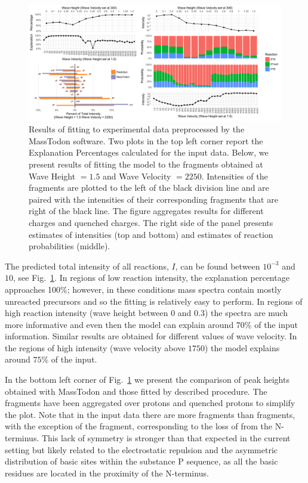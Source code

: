 \documentclass{llncs}
\begin{document}
\begin{figure}[h]
        \center
        \includegraphics[width=1.1\textwidth]{melon.png}
        \caption{ Results of fitting to experimental data preprocessed by the {\sc MassTodon} software. Two plots in the top left corner report the Explanation Percentages calculated for the input data. Below, we present results of fitting the model to the fragments obtained at Wave Height $= 1.5$ and Wave Velocity $= 2250$. Intensities of the  fragments are plotted to the left of the black division line and are paired with the intensities of their corresponding  fragments that are right of the black line. The figure aggregates results for different charges and quenched charges. The right side of the panel presents estimates of intensities (top and bottom) and estimates of reaction probabilities (middle).
        }\label{fig::melon}
\end{figure}
The predicted total intensity of all reactions, $I$, can be found between $10^{-3}$ and $10$, see Fig.~\ref{fig::melon}. In regions of low reaction intensity, the explanation percentage approaches 100\%; however, in these conditions mass spectra contain mostly unreacted precursors and so the fitting is relatively easy to perform. In regions of high reaction intensity (wave height between $0$ and $0.3$) the spectra are much more informative and even then the model can explain around $70\%$ of the input information. Similar results are obtained for different values of wave velocity. In the regions of high intensity (wave velocity above $1750$) the model explains around $75\%$ of the input.

In the bottom left corner of Fig.~\ref{fig::melon} we present the comparison of peak heights obtained with {\sc MassTodon} and those fitted by described procedure. The fragments have been aggregated over protons and quenched protons to simplify the plot. Note that in the input data there are more  fragments than  fragments, with the exception of the  fragment, corresponding to the loss of  from the N-terminus. This lack of symmetry is stronger than that expected in the current setting but likely related to the electrostatic repulsion and the asymmetric distribution of basic sites within the substance P sequence, as all the basic residues are located in the proximity of the N-terminus.
\end{document}
